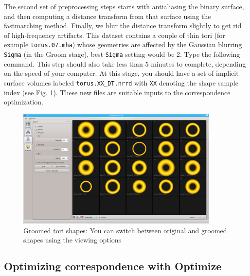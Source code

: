\documentclass[letterpaper,12pt]{article}   %
\begin{document}
The second  set of preprocessing steps starts with antialiasing the binary surface, and then computing a distance transform from that surface using the fastmarching method. Finally, we blur the distance transform slightly to get rid of high-frequency artifacts. This dataset contains a couple of thin tori (for example \texttt{torus.07.mha}) whose geometries are affected by the Gaussian blurring \texttt{Sigma} (in the Groom stage), best  \texttt{Sigma} setting would be 2. Type the following command. This step should also take less than 5 minutes to complete, depending on the speed of your computer. At this stage, you should have a set of implicit surface volumes labeled \texttt{torus.XX\_DT.nrrd} with \texttt{XX} denoting the shape sample index (see Fig. \ref{fig:torus_groom}). These new files are suitable inputs to the correspondence optimization.

\begin{figure}[!htp]
	\centering
	\includegraphics[width=0.9\textwidth]{figs_v2/torus_groom.png}
	\caption{Groomed tori shapes: You can switch between original and groomed shapes using the viewing options}
	\label{fig:torus_groom}
\end{figure}

\subsection{Optimizing correspondence with Optimize}
\end{document}
